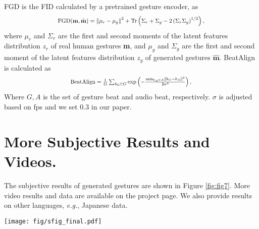 \documentclass[runningheads]{llncs}
\begin{document}
FGD\cite{yoon2020speech} is the FID calculated by a pretrained gesture encoder, as
\begin{equation}
\label{eqfid}
\resizebox{.60\hsize}{!}{$
\operatorname{FGD}(\textbf{m}, \hat{\textbf{m}})=\left\|\mu_{r}-\mu_{g}\right\|^{2}+\operatorname{Tr}\left(\Sigma_{r}+\Sigma_{g}-2\left(\Sigma_{r} \Sigma_{g}\right)^{1 / 2}\right),$}
\end{equation}
where $\mu_{r}$ and $\Sigma_{r}$ are the first and second moments of the latent features distribution $z_{r}$ of real human gestures \textbf{m}, and $\mu_{g}$ and $\Sigma_{g}$ are the first and second moment of the latent features distribution $z_{g}$ of generated gestures $\hat{\textbf{m}}$. BeatAlign \cite{li2021ai} is calculated as
\begin{equation}
\label{align}
\resizebox{.50\hsize}{!}{$
\text {BeatAlign}= \frac{1}{G} \sum_{b_{G}\in G} \exp \left(-\frac{\min _{b_{A}\in A}\left\|b_{G}-b_{A}\right\|^{2}}{2 \sigma^{2}}\right),$}
\end{equation}
Where $G, A$ is the set of gesture beat and audio beat, respectively. $\sigma$ is adjusted based on fps and we set 0.3 in our paper.


\section{More Subjective Results and Videos.}
The subjective results of generated gestures are shown in Figure \ref{fig:fig7}. More video results and data are available on the project page. We also provide results on other languages, \textit{e.g.}, Japanese data.

\begin{figure*}[]

\begin{center}
\texttt{[image: fig/sfig\_final.pdf]}
\end{center}
\caption{
\textbf{Results Visualization.} Ground truth (top) and generated results with neutral (middle) and fear (down) emotions. 
}
\label{fig:fig7}
\end{figure*} 
\end{document}
